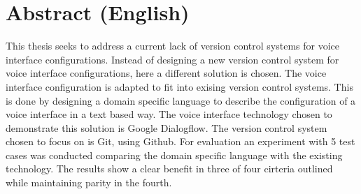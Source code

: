 \chapter*{Abstract (English)}

This thesis seeks to address a current lack of version control systems for voice interface configurations. Instead of designing a new version control system for voice interface configurations, here a different solution is chosen. The voice interface configuration is adapted to fit into exising version control systems.
This is done by designing a domain specific language to describe the configuration of a voice interface in a text based way.
The voice interface technology chosen to demonstrate this solution is Google Dialogflow. The version control system chosen to focus on is Git, using Github.
For evaluation an experiment with 5 test cases was conducted comparing the domain specific language with the existing technology.
The results show a clear benefit in three of four cirteria outlined while maintaining parity in the fourth.